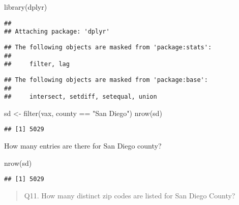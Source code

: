 \documentclass[
]{article}
\newenvironment{Shaded}{\begin{snugshade}}{\end{snugshade}}
\newcommand{\FunctionTok}[1]{\textcolor[rgb]{0.00,0.00,0.00}{#1}}
\newcommand{\NormalTok}[1]{#1}
\newcommand{\OtherTok}[1]{\textcolor[rgb]{0.56,0.35,0.01}{#1}}
\newcommand{\SpecialCharTok}[1]{\textcolor[rgb]{0.00,0.00,0.00}{#1}}
\newcommand{\StringTok}[1]{\textcolor[rgb]{0.31,0.60,0.02}{#1}}
\begin{document}
\begin{Shaded}
\begin{Highlighting}[]
\FunctionTok{library}\NormalTok{(dplyr)}
\end{Highlighting}
\end{Shaded}

\begin{verbatim}
## 
## Attaching package: 'dplyr'
\end{verbatim}

\begin{verbatim}
## The following objects are masked from 'package:stats':
## 
##     filter, lag
\end{verbatim}

\begin{verbatim}
## The following objects are masked from 'package:base':
## 
##     intersect, setdiff, setequal, union
\end{verbatim}

\begin{Shaded}
\begin{Highlighting}[]
\NormalTok{sd }\OtherTok{\textless{}{-}} \FunctionTok{filter}\NormalTok{(vax, county }\SpecialCharTok{==} \StringTok{"San Diego"}\NormalTok{)}
\FunctionTok{nrow}\NormalTok{(sd)}
\end{Highlighting}
\end{Shaded}

\begin{verbatim}
## [1] 5029
\end{verbatim}

How many entries are there for San Diego county?

\begin{Shaded}
\begin{Highlighting}[]
\FunctionTok{nrow}\NormalTok{(sd)}
\end{Highlighting}
\end{Shaded}

\begin{verbatim}
## [1] 5029
\end{verbatim}

\begin{quote}
Q11. How many distinct zip codes are listed for San Diego County?
\end{quote}

\begin{Shaded}
\end{Shaded}
\end{document}
